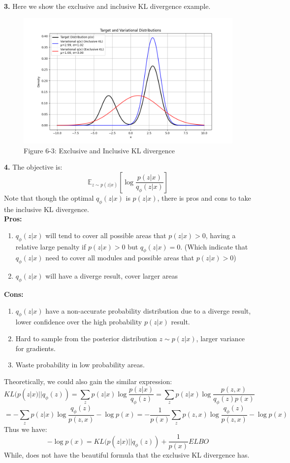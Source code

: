 \documentclass[a4 paper,12pt]{article}
\theoremstyle{definitionstyle}
\begin{document}
\textbf{3.} Here we show the exclusive and inclusive KL divergence example.\\
\begin{figure}[H]
  \centering
  \includegraphics[width=\textwidth]{6-3.png}
  \caption{Figure 6-3: Exclusive and Inclusive KL divergence}
  \label{fig:6-3}
\end{figure}
\textbf{4.} The objective is:
\[
  \mathbb{E}_{z\sim p(z|x)}[\log\frac{p(z|x)}{q_\phi(z|x)}]
\]
Note that though the optimal $q_\phi(z|x)$ is $p(z|x)$, there is pros and cons to take the inclusive KL divergence.\\
\textbf{Pros:}
\begin{enumerate}
  \item $q_\phi(z|x)$ will tend to cover all possible areas that $p(z|x)>0$, having a relative large penalty if $p(z|x)>0$ but $q_\phi(z|x)=0$. (Which indicate that $q_\phi(z|x)$ need to cover all modules and possible areas that $p(z|x)>0$)
  \item $q_\phi(z|x)$ will have a diverge result, cover larger areas
\end{enumerate}
\textbf{Cons:}
\begin{enumerate}
  \item $q_\phi(z|x)$ have a non-accurate probability distribution due to a diverge result, lower confidence over the high probability $p(z|x)$ result.
  \item Hard to sample from the posterior distribution $z\sim p(z|x)$, larger variance for gradients.
  \item Waste probability in low probability areas.
\end{enumerate}
Theoretically, we could also gain the similar expression:
\[
  KL(p(z|x)||q_\phi(z))=\sum_z p(z|x)\log\frac{p(z|x)}{q_\phi(z)}=\sum_z p(z|x)\log\frac{p(z,x)}{q_\phi(z)p(x)}
\]
\[
  =-\sum_z p(z|x)\log\frac{q_\phi(z)}{p(z,x)}-\log p(x)=-\frac{1}{p(x)}\sum_z p(z,x)\log\frac{q_\phi(z)}{p(z,x)}-\log p(x)
\]
Thus we have:
\[
  -\log p(x)=KL(p(z|x)||q_\phi(z))+\frac{1}{p(x)} ELBO  
\]
While, does not have the beautiful formula that the exclusive KL divergence has.
\end{document}
